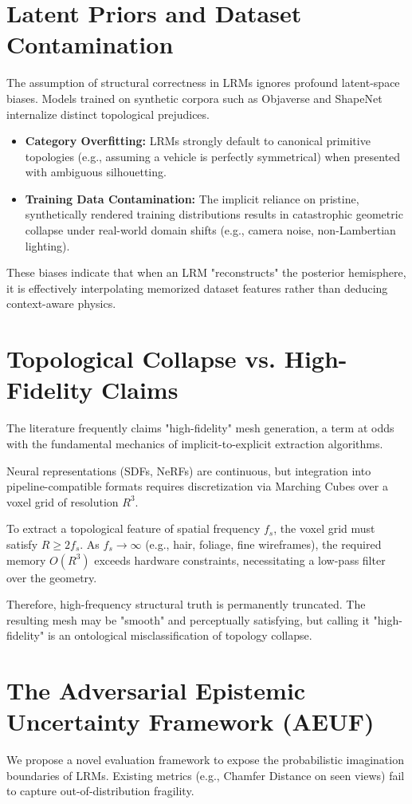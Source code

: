 \documentclass[10pt,journal,compsoc]{IEEEtran}
\begin{document}
\section{Latent Priors and Dataset Contamination}
The assumption of structural correctness in LRMs ignores profound latent-space biases. Models trained on synthetic corpora such as Objaverse and ShapeNet internalize distinct topological prejudices.
\begin{itemize}
    \item \textbf{Category Overfitting:} LRMs strongly default to canonical primitive topologies (e.g., assuming a vehicle is perfectly symmetrical) when presented with ambiguous silhouetting.
    \item \textbf{Training Data Contamination:} The implicit reliance on pristine, synthetically rendered training distributions results in catastrophic geometric collapse under real-world domain shifts (e.g., camera noise, non-Lambertian lighting).
\end{itemize}
These biases indicate that when an LRM "reconstructs" the posterior hemisphere, it is effectively interpolating memorized dataset features rather than deducing context-aware physics.

\section{Topological Collapse vs. High-Fidelity Claims}
The literature frequently claims "high-fidelity" mesh generation, a term at odds with the fundamental mechanics of implicit-to-explicit extraction algorithms. 

Neural representations (SDFs, NeRFs) are continuous, but integration into pipeline-compatible formats requires discretization via Marching Cubes over a voxel grid of resolution $R^3$. 
\begin{lemma}
To extract a topological feature of spatial frequency $f_s$, the voxel grid must satisfy $R \ge 2f_s$. As $f_s \to \infty$ (e.g., hair, foliage, fine wireframes), the required memory $O(R^3)$ exceeds hardware constraints, necessitating a low-pass filter over the geometry.
\end{lemma}
Therefore, high-frequency structural truth is permanently truncated. The resulting mesh may be "smooth" and perceptually satisfying, but calling it "high-fidelity" is an ontological misclassification of topology collapse.

\section{The Adversarial Epistemic Uncertainty Framework (AEUF)}
We propose a novel evaluation framework to expose the probabilistic imagination boundaries of LRMs. Existing metrics (e.g., Chamfer Distance on seen views) fail to capture out-of-distribution fragility.
\end{document}

